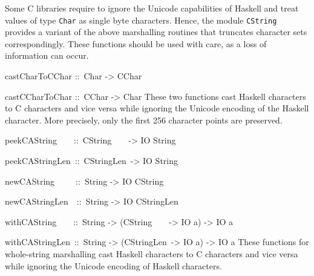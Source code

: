 \documentclass[a4paper,twoside]{article}
\makeatletter
\newcommand{\code}[1]{\texttt{#1}}      %
\newenvironment{codedesc}{%
  \list{}{\labelwidth\z@
    \let\makelabel\codedesclabel}
  }{%
  \endlist
  }
\newcommand*{\codedesclabel}[1]{%
  \hspace{-\leftmargin}
  \parbox[b]{\labelwidth}{\makebox[0pt][l]{\code{#1}}\\}\hfil\relax
  }
\newcommand{\combineitems}{\vspace*{-\itemsep}\vspace*{-\parsep}\vspace*{-1em}}
\makeatother
\begin{document}
Some C libraries require to ignore the Unicode capabilities of Haskell and
treat values of type \code{Char} as single byte characters.  Hence, the module
\code{CString} provides a variant of the above marshalling routines that
truncates character sets correspondingly.  These functions should be used with
care, as a loss of information can occur.
%
\begin{codedesc}
\item[castCharToCChar ::\ Char -> CChar]
\item[castCCharToChar ::\ CChar -> Char] \combineitems These two functions cast
  Haskell characters to C characters and vice versa while ignoring the Unicode
  encoding of the Haskell character.  More precisely, only the first 256
  character points are preserved.

\item[peekCAString~~~~::\ CString~~~~-> IO String]
\item[peekCAStringLen~::\ CStringLen~-> IO String]\combineitems
\item[newCAString~~~~~::\ String -> IO CString]\combineitems
\item[newCAStringLen~~::\ String -> IO CStringLen] \combineitems
\item[withCAString~~~~::\ String -> (CString~~~~-> IO a) -> IO a]\combineitems
\item[withCAStringLen~::\ String -> (CStringLen~-> IO a) -> IO a]
  \combineitems These functions for whole-string marshalling cast Haskell
  characters to C characters and vice versa while ignoring the Unicode
  encoding of Haskell characters.
\end{codedesc}
\end{document}
